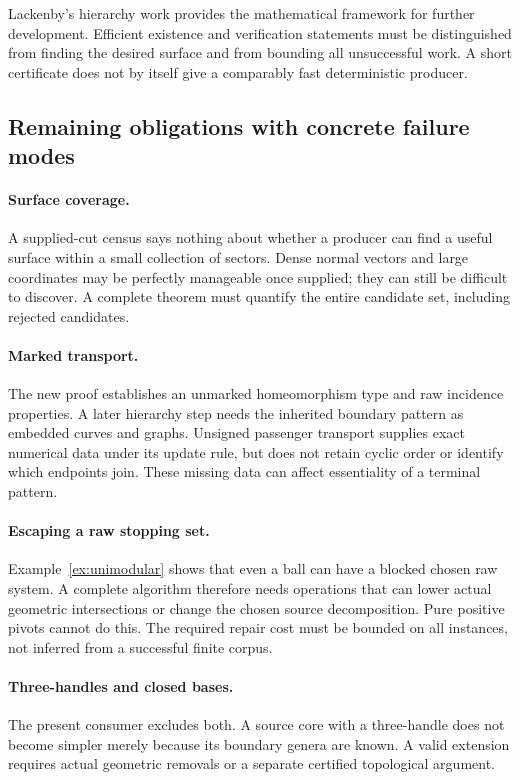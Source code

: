 Lackenby's hierarchy work provides the mathematical framework for further
development\cite{lackenby-2026,lackenby-talk}. Efficient existence and
verification statements must be distinguished from finding the desired
surface and from bounding all unsuccessful work. A short certificate
does not by itself give a comparably fast deterministic producer.

\subsection{Remaining obligations with concrete failure modes}

\paragraph{Surface coverage.}
A supplied-cut census says nothing about whether a producer can find a
useful surface within a small collection of sectors. Dense normal vectors
and large coordinates may be perfectly manageable once supplied; they
can still be difficult to discover. A complete theorem must quantify
the entire candidate set, including rejected candidates.

\paragraph{Marked transport.}
The new proof establishes an unmarked homeomorphism type and raw
incidence properties. A later hierarchy step needs the inherited
boundary pattern as embedded curves and graphs. Unsigned passenger
transport supplies exact numerical data under its update rule, but
does not retain cyclic order or identify which endpoints join. These
missing data can affect essentiality of a terminal pattern.

\paragraph{Escaping a raw stopping set.}
Example~\ref{ex:unimodular} shows that even a ball can have a blocked
chosen raw system. A complete algorithm therefore needs operations that
can lower actual geometric intersections or change the chosen source
decomposition. Pure positive pivots cannot do this. The required repair
cost must be bounded on all instances, not inferred from a successful
finite corpus.

\paragraph{Three-handles and closed bases.}
The present consumer excludes both. A source core with a three-handle
does not become simpler merely because its boundary genera are known.
A valid extension requires actual geometric removals or a separate
certified topological argument.

